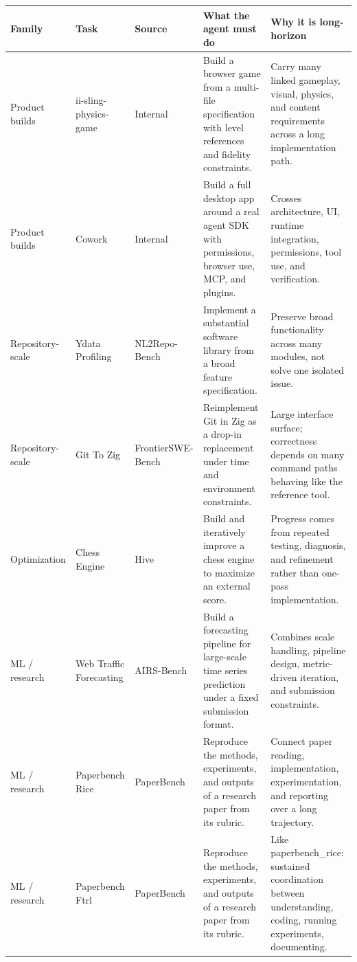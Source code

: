 \documentclass[11pt,a4paper]{article}
\renewcommand{\arraystretch}{1.18}
\newcommand{\code}[1]{#1}
\begin{document}
\begingroup
\renewcommand{\arraystretch}{1.25}
\setlength{\tabcolsep}{4pt}
\footnotesize
\noindent\begin{longtable}{@{}>{\raggedright\arraybackslash}p{2.0cm}>{\raggedright\arraybackslash}p{2.2cm}>{\raggedright\arraybackslash}p{1.8cm}>{\raggedright\arraybackslash}p{4.4cm}>{\raggedright\arraybackslash}p{4.4cm}@{}}
\toprule
\rowcolor{tablehead}\textbf{\color{white}Family} & \textbf{\color{white}Task} & \textbf{\color{white}Source} & \textbf{\color{white}What the agent must do} & \textbf{\color{white}Why it is long-horizon} \\
\midrule
\endhead
Product builds & \code{ii-sling-physics-game} & Internal & Build a browser game from a multi-file specification with level references and fidelity constraints. & Carry many linked gameplay, visual, physics, and content requirements across a long implementation path. \\
\rowcolor{tableband}
Product builds & \code{Cowork} & Internal & Build a full desktop app around a real agent SDK with permissions, browser use, MCP, and plugins. & Crosses architecture, UI, runtime integration, permissions, tool use, and verification. \\
Repository-scale & \code{Ydata Profiling} & NL2Repo-Bench & Implement a substantial software library from a broad feature specification. & Preserve broad functionality across many modules, not solve one isolated issue. \\
\rowcolor{tableband}
Repository-scale & \code{Git To Zig} & FrontierSWE-Bench & Reimplement Git in Zig as a drop-in replacement under time and environment constraints. & Large interface surface; correctness depends on many command paths behaving like the reference tool. \\
Optimization & \code{Chess Engine} & Hive & Build and iteratively improve a chess engine to maximize an external score. & Progress comes from repeated testing, diagnosis, and refinement rather than one-pass implementation. \\
\rowcolor{tableband}
ML / research & \code{Web Traffic Forecasting} & AIRS-Bench & Build a forecasting pipeline for large-scale time series prediction under a fixed submission format. & Combines scale handling, pipeline design, metric-driven iteration, and submission constraints. \\
ML / research & \code{Paperbench Rice} & PaperBench & Reproduce the methods, experiments, and outputs of a research paper from its rubric. & Connect paper reading, implementation, experimentation, and reporting over a long trajectory. \\
\rowcolor{tableband}
ML / research & \code{Paperbench Ftrl} & PaperBench & Reproduce the methods, experiments, and outputs of a research paper from its rubric. & Like \code{paperbench\_rice}: sustained coordination between understanding, coding, running experiments, documenting. \\
\bottomrule
\end{longtable}
\endgroup
\end{document}
